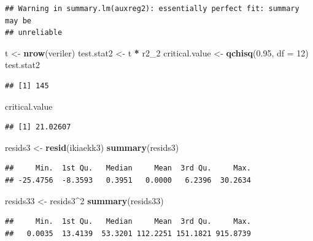 \documentclass[]{article}
\newenvironment{Shaded}{\begin{snugshade}}{\end{snugshade}}
\newcommand{\KeywordTok}[1]{\textcolor[rgb]{0.13,0.29,0.53}{\textbf{#1}}}
\newcommand{\DataTypeTok}[1]{\textcolor[rgb]{0.13,0.29,0.53}{#1}}
\newcommand{\DecValTok}[1]{\textcolor[rgb]{0.00,0.00,0.81}{#1}}
\newcommand{\FloatTok}[1]{\textcolor[rgb]{0.00,0.00,0.81}{#1}}
\newcommand{\StringTok}[1]{\textcolor[rgb]{0.31,0.60,0.02}{#1}}
\newcommand{\OperatorTok}[1]{\textcolor[rgb]{0.81,0.36,0.00}{\textbf{#1}}}
\newcommand{\NormalTok}[1]{#1}
\begin{document}
\begin{verbatim}
## Warning in summary.lm(auxreg2): essentially perfect fit: summary may be
## unreliable
\end{verbatim}

\begin{Shaded}
\begin{Highlighting}[]
\NormalTok{t <-}\StringTok{ }\KeywordTok{nrow}\NormalTok{(veriler)}
\NormalTok{test.stat2 <-}\StringTok{ }\NormalTok{t }\OperatorTok{*}\StringTok{ }\NormalTok{r2_}\DecValTok{2}
\NormalTok{critical.value <-}\StringTok{ }\KeywordTok{qchisq}\NormalTok{(}\FloatTok{0.95}\NormalTok{, }\DataTypeTok{df =} \DecValTok{12}\NormalTok{)}
\NormalTok{test.stat2}
\end{Highlighting}
\end{Shaded}

\begin{verbatim}
## [1] 145
\end{verbatim}

\begin{Shaded}
\begin{Highlighting}[]
\NormalTok{critical.value}
\end{Highlighting}
\end{Shaded}

\begin{verbatim}
## [1] 21.02607
\end{verbatim}

\begin{Shaded}
\begin{Highlighting}[]
\NormalTok{resids3 <-}\StringTok{ }\KeywordTok{resid}\NormalTok{(ikiaekk3)}
\KeywordTok{summary}\NormalTok{(resids3)}
\end{Highlighting}
\end{Shaded}

\begin{verbatim}
##     Min.  1st Qu.   Median     Mean  3rd Qu.     Max. 
## -25.4756  -8.3593   0.3951   0.0000   6.2396  30.2634
\end{verbatim}

\begin{Shaded}
\begin{Highlighting}[]
\NormalTok{resids33 <-}\StringTok{ }\NormalTok{resids3}\OperatorTok{^}\DecValTok{2}
\KeywordTok{summary}\NormalTok{(resids33)}
\end{Highlighting}
\end{Shaded}

\begin{verbatim}
##     Min.  1st Qu.   Median     Mean  3rd Qu.     Max. 
##   0.0035  13.4139  53.3201 112.2251 151.1821 915.8739
\end{verbatim}
\end{document}
